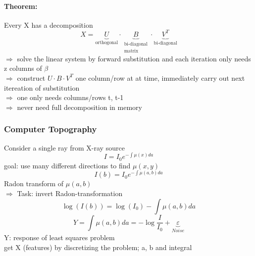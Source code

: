 \documentclass[11pt]{article}
\begin{document}
      \paragraph{Theorem:} Every X has a decomposition
      \begin{equation*}
        X = \underbrace{U}_{\text{orthogonal}} \cdot \underbrace{B}_
        {\substack{\text{bi-diagonal} \\ \text{matrix}}} \cdot \underbrace{V^T}_
        {\text{bi-diagonal}}
      \end{equation*}
      $\Rightarrow$ solve the linear system by forward substitution
      and each iteration only needs z columns of $\beta$ \\
      $\Rightarrow$ construct $U \cdot B \cdot V^T$ one column/row
      at at time, immediately carry out next itereation of substitution \\
      $\Rightarrow$ one only needs columns/rows t, t-1\\
      $\Rightarrow$ never need full decomposition in memory
      \subsubsection{Computer Topography}
      Consider a single ray from X-ray source
      \begin{equation*}
        I = I_0e^{-\int\mu(x)da}
      \end{equation*}
      goal: use many different directions to find $\mu(x,y)$
      \begin{equation*}
        \boxed{I(b)=I_0e^{-\int \mu(a,b)da}}
      \end{equation*}
      Radon transform of $\mu(a,b)$ \\
      $\Rightarrow$ Task: invert Radon-transformation
      \begin{equation*}
      \log(I(b)) = \log(I_0) - \int \mu(a,b)da
      \end{equation*}
      \begin{equation*}
        Y = \int \mu(a,b)da = -\log \frac{I}{I_0} + \underbrace{\varepsilon}_{Noise}
      \end{equation*}
      Y: response of least squares problem \\
      get X (features) by discretizing the problem; a, b and integral
\end{document}
